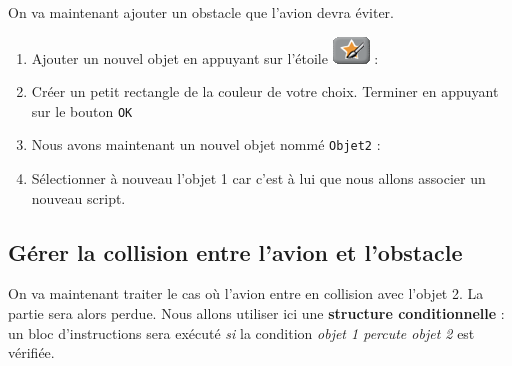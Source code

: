 On va maintenant ajouter un obstacle que l'avion devra éviter.

\begin{enumerate}
\item Ajouter un nouvel objet en appuyant sur l'étoile \includegraphics[width=.7cm]{./images/scratch/EtoilePinceau} :
\item Créer un petit rectangle de la couleur de votre choix.
Terminer en appuyant sur le bouton \texttt{OK}
\item Nous avons maintenant un nouvel objet nommé \texttt{Objet2} :
\item Sélectionner à nouveau l'objet 1 car c'est à lui que nous allons associer un nouveau script.
\end{enumerate}


\subsection{Gérer la collision entre l'avion et l'obstacle} 

On va maintenant traiter le cas où l'avion entre en collision avec l'objet 2. La partie sera alors perdue. Nous allons utiliser ici une \textbf{structure conditionnelle} : un bloc d'instructions sera exécuté \emph{si} la condition \emph{objet 1 percute objet 2} est vérifiée. 

\vspace{12pt}


\vspace{12pt}





